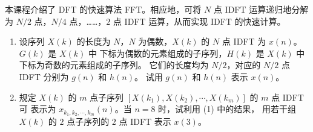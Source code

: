 \begin{exercise}
    本课程介绍了 DFT 的快速算法 FFT。相应地，可将 $N$ 点 IDFT 运算递归地分解
    为 $N/2$ 点，$N/4$ 点，……，$2$ 点 IDFT 运算，从而实现 IDFT 的快速计算。
    \begin{enumerate}[label=(\arabic*)]
        \item 设序列 $X(k)$ 的长度为 $N$，$N$ 为偶数，$X(k)$ 的 $N$ 点 IDFT 为 $x(n)$。$G(k)$ 是 $X(k)$ 中
            下标为偶数的元素组成的子序列，$H(k)$ 是 $X(k)$ 中下标为奇数的元素组成的子序列。
            它们的长度均为 $N/2$，对应的 $N/2$ 点 IDFT 分别为 $g(n)$ 和 $h(n)$。
            试用 $g(n)$ 和 $h(n)$ 表示 $x(n)$。        
        \item 规定 $X(k)$ 的 $m$ 点子序列 $[X(k_1), X(k_2), \cdots, X(k_m)]$ 的 $m$ 点 IDFT 可
            表示为 $x_{k_1, k_2, \cdots, k_m}(n)$。当 $n = 8$ 时，试利用 (1) 中的结果，
            用若干组 $X(k)$ 的 $2$ 点子序列的 $2$ 点 IDFT 表示 $x(3)$。
    \end{enumerate}
\end{exercise}

